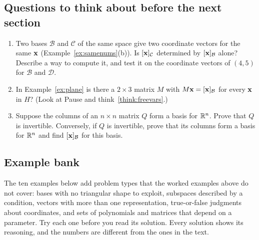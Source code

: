 \documentclass[11pt]{article}
\begin{document}
\subsection*{Questions to think about before the next section}
\begin{enumerate}
  \item Two bases $\mathcal{B}$ and $\mathcal{C}$ of the same space give two coordinate vectors for the same $\mathbf{x}$ (Example~\ref{ex:samenums}(b)). Is $[\mathbf{x}]_{\mathcal{C}}$ determined by $[\mathbf{x}]_{\mathcal{B}}$ alone? Describe a way to compute it, and test it on the coordinate vectors of $(4,5)$ for $\mathcal{B}$ and $\mathcal{D}$.
  \item In Example~\ref{ex:plane} is there a $2\times3$ matrix $M$ with $M\mathbf{x}=[\mathbf{x}]_{\mathcal{B}}$ for every $\mathbf{x}$ in $H$? (Look at Pause and think~\ref{think:freevars}.)
  \item Suppose the columns of an $n\times n$ matrix $Q$ form a basis for $\mathbb{R}^n$. Prove that $Q$ is invertible. Conversely, if $Q$ is invertible, prove that its columns form a basis for $\mathbb{R}^n$ and find $[\mathbf{x}]_{\mathcal{B}}$ for this basis.
\end{enumerate}

\subsection*{Example bank}
The ten examples below add problem types that the worked examples above do not cover: bases with no triangular shape to exploit, subspaces described by a condition, vectors with more than one representation, true-or-false judgments about coordinates, and sets of polynomials and matrices that depend on a parameter. Try each one before you read its solution. Every solution shows its reasoning, and the numbers are different from the ones in the text.
\end{document}
